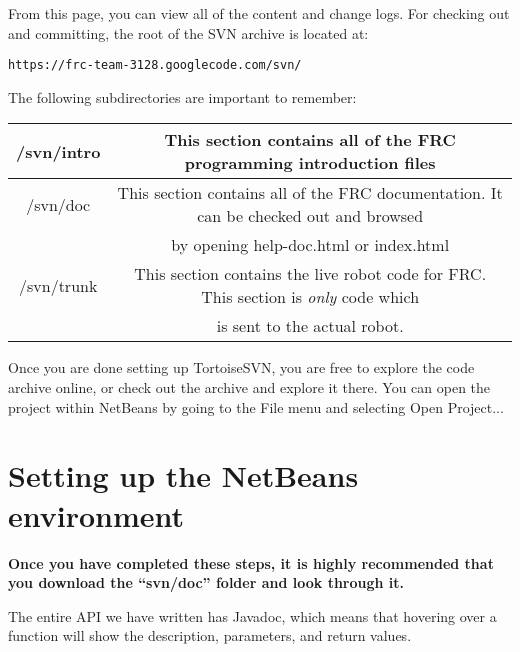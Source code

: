 \documentclass[a4paper]{article}
\begin{document}
From this page, you can view all of the content and change logs. For checking out and committing, the root of the SVN archive is located at: \begin{verbatim}https://frc-team-3128.googlecode.com/svn/\end{verbatim}

The following subdirectories are important to remember:

\noindent\begin{tabular}{|c|c|}
\hline /svn/intro & This section contains all of the FRC programming introduction files\\
\hline /svn/doc & This section contains all of the FRC documentation. It can be checked out and browsed\\ & by opening help-doc.html or index.html\\
\hline /svn/trunk & This section contains the live robot code for FRC. This section is \textit{only} code which \\ & is sent to the actual robot.\\\hline
\end{tabular}

Once you are done setting up TortoiseSVN, you are free to explore the code archive online, or check out the archive and explore it there. You can open the project within NetBeans by going to the File menu and selecting Open Project...

\section{Setting up the NetBeans environment}

\textbf{Once you have completed these steps, it is highly recommended that you download the ``svn/doc'' folder and look through it.}

The entire API we have written has Javadoc, which means that hovering over a function will show the description, parameters, and return values.
\end{document}
